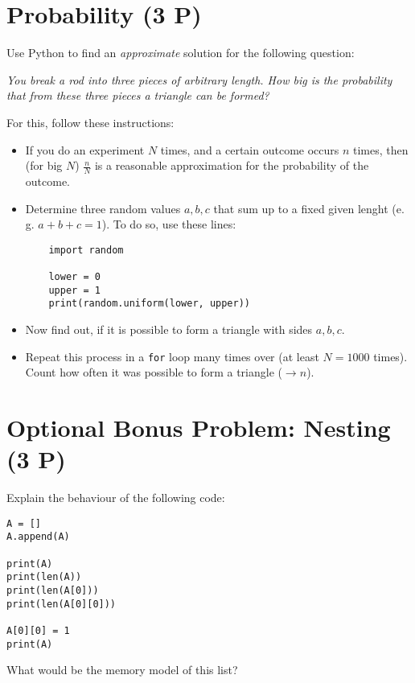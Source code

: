 \documentclass[
	ngerman,
	fontsize=10pt,
	parskip=half,
	titlepage=true,
	DIV=12
]{scrartcl}
\newcommand*{\inPy}[1]{\texttt{#1}}
\newcommand*{\eg}{e.\,g. }
\begin{document}
\section{Probability (3 P)}
Use Python to find an \emph{approximate} solution for the following question:
\begin{center}
	\emph{You break a rod into three pieces of arbitrary length. How big is the probability that from these three pieces a triangle can be formed?}
\end{center}

For this, follow these instructions:
\begin{itemize}
\item If you do an experiment $N$ times, and a certain outcome occurs $n$ times, then (for big $N$) $\frac{n}{N}$ is a reasonable approximation for the probability of
	the outcome.
\item Determine three random values $a, b, c$ that sum up to a fixed given lenght (\eg $a+b+c=1$). To do so, use these lines:
	\begin{verbatim}
	import random
	
	lower = 0
	upper = 1
	print(random.uniform(lower, upper))
	\end{verbatim}
\item Now find out, if it is possible to form a triangle with sides $a, b, c$.
\item Repeat this process in a \inPy{for} loop many times over (at least $N=1000$ times). Count how often it was possible to form a triangle ($\rightarrow n$).
\end{itemize}


\section*{Optional Bonus Problem: Nesting (3 P)}
Explain the behaviour of the following code:

\begin{verbatim}
A = []
A.append(A)

print(A)
print(len(A))
print(len(A[0]))
print(len(A[0][0]))

A[0][0] = 1
print(A)
\end{verbatim}

What would be the memory model of this list?
\end{document}
